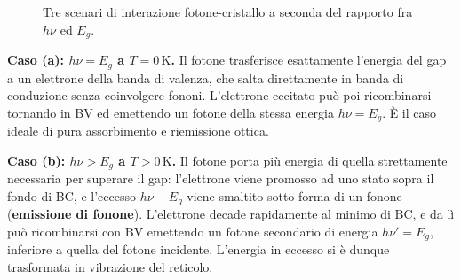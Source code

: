 \begin{example}
\begin{figure}[htbp]
    \hfill
    \caption{Tre scenari di interazione fotone-cristallo a seconda del rapporto fra \( h\nu \) ed \( E_g \).}
    \label{fig:assorbimento_emissione_fononi}
\end{figure}

\textbf{Caso (a): \( h\nu = E_g \) a \( T = 0\,\text{K} \).} Il fotone trasferisce esattamente l'energia del gap a un elettrone della banda di valenza, che salta direttamente in banda di conduzione senza coinvolgere fononi. L'elettrone eccitato può poi ricombinarsi tornando in BV ed emettendo un fotone della stessa energia \( h\nu = E_g \). È il caso ideale di pura assorbimento e riemissione ottica.

\textbf{Caso (b): \( h\nu > E_g \) a \( T > 0\,\text{K} \).} Il fotone porta più energia di quella strettamente necessaria per superare il gap: l'elettrone viene promosso ad uno stato sopra il fondo di BC, e l'eccesso \( h\nu - E_g \) viene smaltito sotto forma di un fonone (\textbf{emissione di fonone}). L'elettrone decade rapidamente al minimo di BC, e da lì può ricombinarsi con BV emettendo un fotone secondario di energia \( h\nu' = E_g \), inferiore a quella del fotone incidente. L'energia in eccesso si è dunque trasformata in vibrazione del reticolo.


\end{example}
